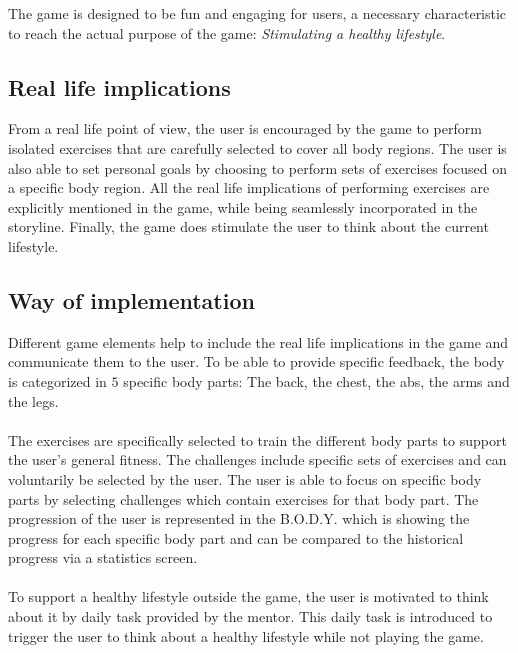 
The game is designed to be fun and engaging for users, a necessary characteristic to reach the actual purpose of the game: \textit{Stimulating a healthy lifestyle}. 

\subsection{Real life implications}
From a real life point of view, the user is encouraged by the game to perform isolated exercises that are carefully selected to cover all body regions. The user is also able to set personal goals by choosing to perform sets of exercises focused on a specific body region. All the real life implications of performing exercises are explicitly mentioned in the game, while being seamlessly incorporated in the storyline. Finally, the game does stimulate the user to think about the current lifestyle.

\subsection{Way of implementation}
Different game elements help to include the real life implications in the game and communicate them to the user. To be able to provide specific feedback, the body is categorized in $5$ specific body parts: The back, the chest, the abs, the arms and the legs. \\
\\
The exercises are specifically selected to train the different body parts to support the user's general fitness. The challenges include specific sets of exercises and can voluntarily be selected by the user. The user is able to focus on specific body parts by selecting challenges which contain exercises for that body part. The progression of the user is represented in the B.O.D.Y. which is showing the progress for each specific body part and can be compared to the historical progress via a statistics screen. \\
\\
To support a healthy lifestyle outside the game, the user is motivated to think about it by daily task provided by the mentor. This daily task is introduced to trigger the user to think about a healthy lifestyle while not playing the game. 

